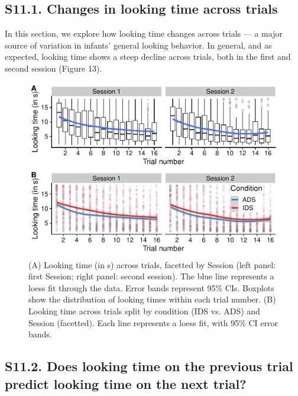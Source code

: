 \documentclass[
  man, donotrepeattitle,floatsintext]{apa6}
\begin{document}
\hypertarget{s11.1.-changes-in-looking-time-across-trials}{%
\subsection{S11.1. Changes in looking time across trials}\label{s11.1.-changes-in-looking-time-across-trials}}

In this section, we explore how looking time changes across trials --- a major source of variation in infants' general looking behavior.
In general, and as expected, looking time shows a steep decline across trials, both in the first and second session (Figure 13).

\begin{figure}

{\centering \includegraphics{MB1T_supplement_files/figure-latex/fig13-1} 

}

\caption{(A) Looking time (in s) across trials, facetted by Session (left panel: first Session; right panel: second session). The blue line represents a loess fit through the data. Error bands represent 95\% CIs. Boxplots show the distribution of looking times within each trial number. (B) Looking time across trials split by condition (IDS vs. ADS) and Session (facetted). Each line represents a loess fit, with 95\% CI error bands.}\label{fig:fig13}
\end{figure}

\hypertarget{s11.2.-does-looking-time-on-the-previous-trial-predict-looking-time-on-the-next-trial}{%
\subsection{S11.2. Does looking time on the previous trial predict looking time on the next trial?}\label{s11.2.-does-looking-time-on-the-previous-trial-predict-looking-time-on-the-next-trial}}
\end{document}
